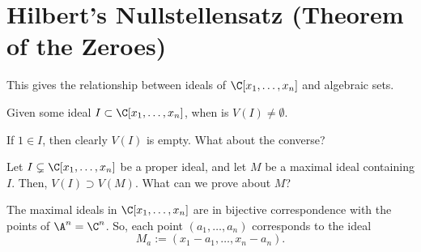 \section{Hilbert's Nullstellensatz (Theorem of the Zeroes)}

This gives the relationship between ideals of $\C[x_1,\dots,x_n]$ and algebraic sets.

\begin{notebox*}[Question]
    Given some ideal $I \subset \C[x_1,\dots,x_n]$, when is $V(I) \neq \emptyset$.
\end{notebox*}

If $1 \in I$, then clearly $V(I)$ is empty. What about the converse?

Let $I \subsetneq \C[x_1,\dots,x_n]$ be a proper ideal, and let $M$ be a maximal ideal containing $I$. Then, $V(I) \supset V(M)$. What can we prove about $M$?

\begin{thm}
    The maximal ideals in $\C[x_1,\dots,x_n]$ are in bijective correspondence with the points of $\A^n=\C^n$. So, each point $(a_1,\dots,a_n)$ corresponds to the ideal
    $$M_a:=(x_1-a_1,\dots,x_n-a_n).$$
\end{thm}

